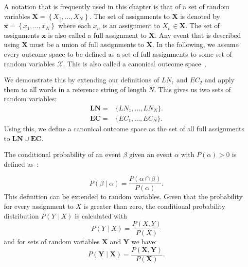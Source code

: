 \bigskip

A notation that is frequently used in this chapter is that of a set of \glspl{random variable} $\mathbf{X}=\left\{ X_1,\dots,X_N\right\}$.
The set of \glspl{assignment} to $\mathbf{X}$ is denoted by $\mathbf{x}=\left\{ x_1,\dots,x_N\right\}$ where each $x_n$ is an \gls{assignment} to $X_n\in\mathbf{X}$.
The set of \glspl{assignment} $\mathbf{x}$ is also called a \gls{full assignment} to $\mathbf{X}$.
Any \gls{event} that is described using $\mathbf{X}$ must be a union of \glspl{full assignment} to $\mathbf{X}$.
In the following, we assume every \gls{outcome space}  to be defined as a set of \glspl{full assignment} to some set of \glspl{random variable} $\mathcal{X}$.
This is also called a \gls{canonical outcome space}~\citep{koller2009probabilistic}.

We demonstrate this by extending our definitions of $LN_1$ and $EC_2$ and apply them to all words in a reference string of length $N$.
This gives us two sets of \glspl{random variable}:
\begin{equation*}
  \begin{split}
    \mathbf{LN}=& \{LN_1, \dots, LN_N\}.\\
    \mathbf{EC}=& \{EC_1, \dots, EC_N\}.
  \end{split}
\end{equation*}
Using this, we define a \gls{canonical outcome space}  as the set of all \glspl{full assignment} to $\mathbf{LN}\cup\mathbf{EC}$.

\bigskip

The \gls{conditional probability} of an \gls{event} $\beta$ given an \gls{event} $\alpha$ with $P(\alpha)>0$ is defined as~\cite{koller2009probabilistic}:

\begin{equation}
\label{equ:conditional-probability-event}
P(\beta\mid\alpha) = \frac{P(\alpha\cap\beta)}{P(\alpha)}.
\end{equation}
This definition can be extended to \glspl{random variable}.
Given that the probability for every \gls{assignment} to $X$ is greater than zero, the \gls{conditional probability distribution} $P(Y\mid X)$ is calculated with
\begin{equation}
\label{equ:conditional-probability-random-variable}
P(Y\mid X) = \frac{P(X,Y)}{P(X)}
\end{equation}
and for sets of \glspl{random variable} $\mathbf{X}$ and $\mathbf{Y}$ we have:
\begin{equation}
\label{equ:conditional-probability-random-variable}
P(\mathbf{Y}\mid \mathbf{X}) = \frac{P(\mathbf{X},\mathbf{Y})}{P(\mathbf{X})}.
\end{equation}

